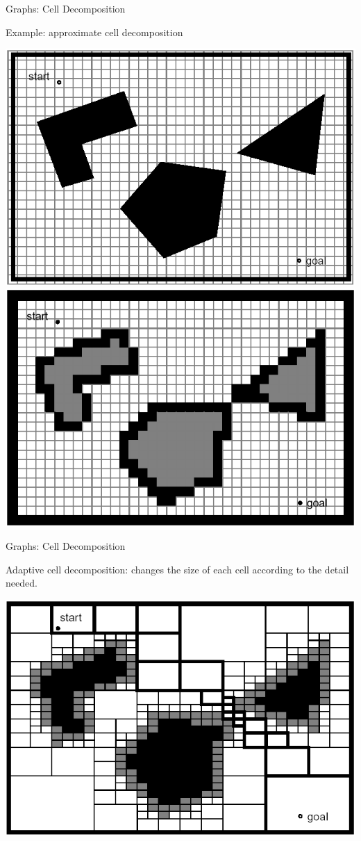 \documentclass[compress]{beamer}
\begin{document}
\begin{frame}{Graphs: Cell Decomposition}

Example: approximate cell decomposition

    \begin{center}
        \includegraphics[width=0.4\linewidth]{celldecomposition1}
        \hspace{1em}
        \includegraphics[width=0.4\linewidth]{celldecomposition2}
    \end{center}

\end{frame}

\begin{frame}{Graphs: Cell Decomposition}

Adaptive cell decomposition: changes the size of each cell according
  to the detail needed.

    \begin{center}
        \includegraphics[width=0.8\linewidth]{adaptivecelldecomposition}
    \end{center}
\end{frame}
\end{document}
